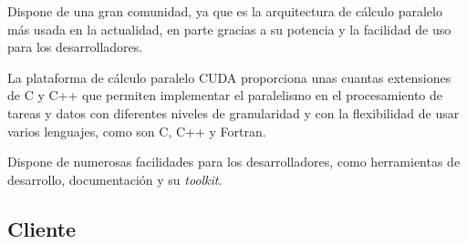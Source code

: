 \begin{itemize}
	Dispone de una gran comunidad, ya que es la arquitectura de cálculo paralelo más usada en la actualidad, en parte gracias a su potencia y la facilidad de uso para los desarrolladores.

	
	La plataforma de cálculo paralelo CUDA proporciona unas cuantas extensiones de C y C++ que permiten implementar el paralelismo en el procesamiento de tareas y datos con diferentes niveles de granularidad y con la flexibilidad de usar varios lenguajes, como son C, C++ y Fortran. 
	
	Dispone de numerosas facilidades para los desarrolladores, como herramientas de desarrollo, documentación y su \textit{toolkit}.

	
		
\end{itemize}
	

\newpage
\subsection{Cliente}
\bigskip


